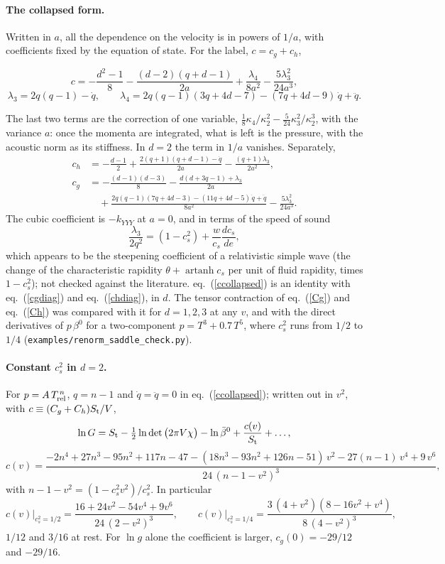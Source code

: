 \documentclass[11pt,aps,preprint,nofootinbib,superscriptaddress,tightenlines]{revtex4-2}
\def\st{\begin{equation}}
\def\stp{\end{equation}}
\def\Eq#1{eq.~(\ref{#1})}
\let\oldparagraph\paragraph
\renewcommand{\paragraph}{\par\bigskip\oldparagraph}
\begin{document}
\paragraph{The collapsed form.}  Written in $a$, all the dependence on the velocity is in powers of $1/a$, with coefficients fixed by the equation
of state.  For the label, $c=c_g+c_h$,
\begin{keyeq}
\st
c=-\frac{d^2-1}8-\frac{(d-2)(q+d-1)}{2a}+\frac{\lambda_4}{8a^2}-\frac{5\lambda_3^2}{24a^3},
\label{ccollapsed}
\stp
\st
\lambda_3=2q(q-1)-\dot q,\qquad
\lambda_4=2q(q-1)(3q+4d-7)-(7q+4d-9)\,\dot q+\ddot q .
\stp
\end{keyeq}
The last two terms are the correction of one variable, $\tfrac18\kappa_4/\kappa_2^2-\tfrac5{24}\kappa_3^2/\kappa_2^3$, with the variance $a$: once the
momenta are integrated, what is left is the pressure, with the acoustic norm as its stiffness.  In $d=2$ the term in $1/a$ vanishes.  Separately,
\begin{align}
c_h&=-\frac{d-1}2+\frac{2(q+1)(q+d-1)-\dot q}{2a}-\frac{(q+1)\lambda_3}{2a^2}, \nonumber\\
c_g&=-\frac{(d-1)(d-3)}8-\frac{d(d+3q-1)+\lambda_3}{2a} \nonumber\\
&\quad+\frac{2q(q-1)(7q+4d-3)-(11q+4d-5)\,\dot q+\ddot q}{8a^2}-\frac{5\lambda_3^2}{24a^3} .
\end{align}
The cubic coefficient is $-k_{YYY}$ at $a=0$, and in terms of the speed of sound
\st
\frac{\lambda_3}{2q^2}=(1-c_s^2)+\frac w{c_s}\frac{dc_s}{de} ,
\stp
which appears to be the steepening coefficient of a relativistic simple wave (the change of the characteristic rapidity
$\theta+\operatorname{artanh}c_s$ per unit of fluid rapidity, times $1-c_s^2$); not checked against the literature.  \Eq{ccollapsed} is an identity
with \Eq{cgdiag} and \Eq{chdiag}, in $d$.  The tensor contraction of \Eq{Cg} and \Eq{Ch} was compared with it for $d=1,2,3$ at any $v$, and with
the direct derivatives of $p\,\beta^0$ for a two-component $p=T^3+0.7\,T^5$, where $c_s^2$ runs from $1/2$ to $1/4$
(\nolinkurl{examples/renorm_saddle_check.py}).

\paragraph{Constant $c_s^2$ in $d=2$.}  For $p=A\,T_{\rm rel}^{\,n}$, $q=n-1$ and $\dot q=\ddot q=0$ in \Eq{ccollapsed}; written out in $v^2$, with $c\equiv(C_g+C_h)S_{\rm t}/V$,
\st
\ln G=S_{\rm t}-\tfrac12\ln\det\big(2\pi V\chi\big)-\ln\bar\beta^0+\frac{c(v)}{S_{\rm t}}+\dots,
\stp
\st
c(v)=\frac{-2n^4+27n^3-95n^2+117n-47-(18n^3-93n^2+126n-51)\,v^2-27(n-1)\,v^4+9\,v^6}{24\,(n-1-v^2)^3} ,
\label{cv}
\stp
with $n-1-v^2=(1-c_s^2v^2)/c_s^2$.  In particular
\st
c(v)\Big|_{c_s^2=1/2}=\frac{16+24v^2-54v^4+9v^6}{24\,(2-v^2)^3},\qquad
c(v)\Big|_{c_s^2=1/4}=\frac{3\,(4+v^2)(8-16v^2+v^4)}{8\,(4-v^2)^3} ,
\stp
$1/12$ and $3/16$ at rest.  For $\ln g$ alone the coefficient is larger, $c_g(0)=-29/12$ and $-29/16$.
\end{document}
